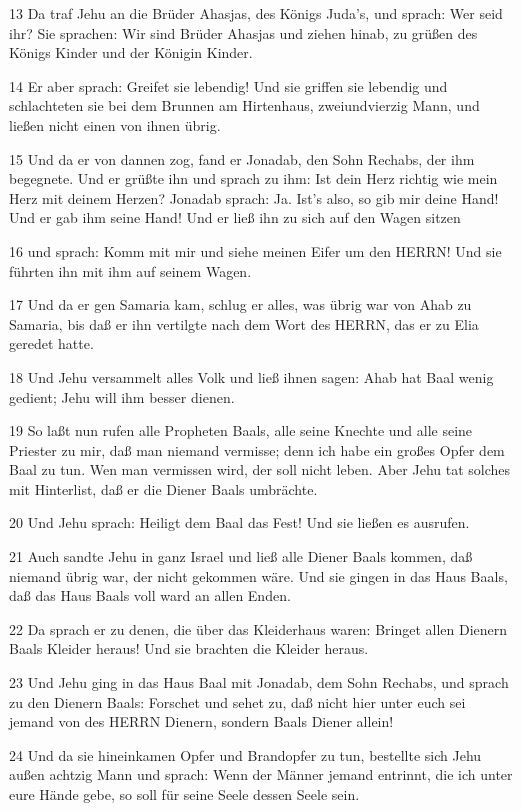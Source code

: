 \par 13 Da traf Jehu an die Brüder Ahasjas, des Königs Juda's, und sprach: Wer seid ihr? Sie sprachen: Wir sind Brüder Ahasjas und ziehen hinab, zu grüßen des Königs Kinder und der Königin Kinder.
\par 14 Er aber sprach: Greifet sie lebendig! Und sie griffen sie lebendig und schlachteten sie bei dem Brunnen am Hirtenhaus, zweiundvierzig Mann, und ließen nicht einen von ihnen übrig.
\par 15 Und da er von dannen zog, fand er Jonadab, den Sohn Rechabs, der ihm begegnete. Und er grüßte ihn und sprach zu ihm: Ist dein Herz richtig wie mein Herz mit deinem Herzen? Jonadab sprach: Ja. Ist's also, so gib mir deine Hand! Und er gab ihm seine Hand! Und er ließ ihn zu sich auf den Wagen sitzen
\par 16 und sprach: Komm mit mir und siehe meinen Eifer um den HERRN! Und sie führten ihn mit ihm auf seinem Wagen.
\par 17 Und da er gen Samaria kam, schlug er alles, was übrig war von Ahab zu Samaria, bis daß er ihn vertilgte nach dem Wort des HERRN, das er zu Elia geredet hatte.
\par 18 Und Jehu versammelt alles Volk und ließ ihnen sagen: Ahab hat Baal wenig gedient; Jehu will ihm besser dienen.
\par 19 So laßt nun rufen alle Propheten Baals, alle seine Knechte und alle seine Priester zu mir, daß man niemand vermisse; denn ich habe ein großes Opfer dem Baal zu tun. Wen man vermissen wird, der soll nicht leben. Aber Jehu tat solches mit Hinterlist, daß er die Diener Baals umbrächte.
\par 20 Und Jehu sprach: Heiligt dem Baal das Fest! Und sie ließen es ausrufen.
\par 21 Auch sandte Jehu in ganz Israel und ließ alle Diener Baals kommen, daß niemand übrig war, der nicht gekommen wäre. Und sie gingen in das Haus Baals, daß das Haus Baals voll ward an allen Enden.
\par 22 Da sprach er zu denen, die über das Kleiderhaus waren: Bringet allen Dienern Baals Kleider heraus! Und sie brachten die Kleider heraus.
\par 23 Und Jehu ging in das Haus Baal mit Jonadab, dem Sohn Rechabs, und sprach zu den Dienern Baals: Forschet und sehet zu, daß nicht hier unter euch sei jemand von des HERRN Dienern, sondern Baals Diener allein!
\par 24 Und da sie hineinkamen Opfer und Brandopfer zu tun, bestellte sich Jehu außen achtzig Mann und sprach: Wenn der Männer jemand entrinnt, die ich unter eure Hände gebe, so soll für seine Seele dessen Seele sein.
